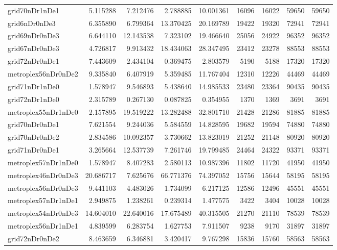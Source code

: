 \begin{longtable}{|l|r|r|r|r|r|r|r|r|}
grid70nDr1nDe1 & 5.115288 & 7.212476 & 2.788885 & 10.001361 & 16096 & 16022 & 59650 & 59650 \\
grid6nDr0nDe3 & 6.355890 & 6.799364 & 13.370425 & 20.169789 & 19422 & 19320 & 72941 & 72941 \\
grid69nDr0nDe3 & 6.644110 & 12.143538 & 7.323102 & 19.466640 & 25056 & 24922 & 96352 & 96352 \\
grid67nDr0nDe3 & 4.726817 & 9.913432 & 18.434063 & 28.347495 & 23412 & 23278 & 88553 & 88553 \\
grid72nDr0nDe1 & 7.443609 & 2.434104 & 0.369475 & 2.803579 & 5190 & 5188 & 17320 & 17320 \\
metroplex56nDr0nDe2 & 9.335840 & 6.407919 & 5.359485 & 11.767404 & 12310 & 12226 & 44469 & 44469 \\
grid71nDr1nDe0 & 1.578947 & 9.546893 & 5.438640 & 14.985533 & 23480 & 23364 & 90435 & 90435 \\
grid72nDr1nDe0 & 2.315789 & 0.267130 & 0.087825 & 0.354955 & 1370 & 1369 & 3691 & 3691 \\
metroplex55nDr1nDe0 & 2.157895 & 19.519222 & 13.282488 & 32.801710 & 21428 & 21286 & 81885 & 81885 \\
grid70nDr0nDe1 & 7.621554 & 9.244036 & 5.584559 & 14.828595 & 19682 & 19594 & 74880 & 74880 \\
grid70nDr0nDe2 & 2.834586 & 10.092357 & 3.730662 & 13.823019 & 21252 & 21148 & 80920 & 80920 \\
grid71nDr0nDe1 & 3.265664 & 12.537739 & 7.261746 & 19.799485 & 24464 & 24322 & 93371 & 93371 \\
metroplex57nDr1nDe0 & 1.578947 & 8.407283 & 2.580113 & 10.987396 & 11802 & 11720 & 41950 & 41950 \\
metroplex46nDr0nDe3 & 20.686717 & 7.625676 & 66.771376 & 74.397052 & 15756 & 15644 & 58195 & 58195 \\
metroplex56nDr0nDe3 & 9.441103 & 4.483026 & 1.734099 & 6.217125 & 12586 & 12496 & 45551 & 45551 \\
metroplex57nDr1nDe1 & 2.949875 & 1.238261 & 0.239314 & 1.477575 & 3422 & 3404 & 10028 & 10028 \\
metroplex54nDr0nDe3 & 14.604010 & 22.640016 & 17.675489 & 40.315505 & 21270 & 21110 & 78539 & 78539 \\
metroplex56nDr1nDe1 & 4.839599 & 6.283754 & 1.627753 & 7.911507 & 9238 & 9170 & 31897 & 31897 \\
grid72nDr0nDe2 & 8.463659 & 6.346881 & 3.420417 & 9.767298 & 15836 & 15760 & 58563 & 58563 \\

\end{longtable}
